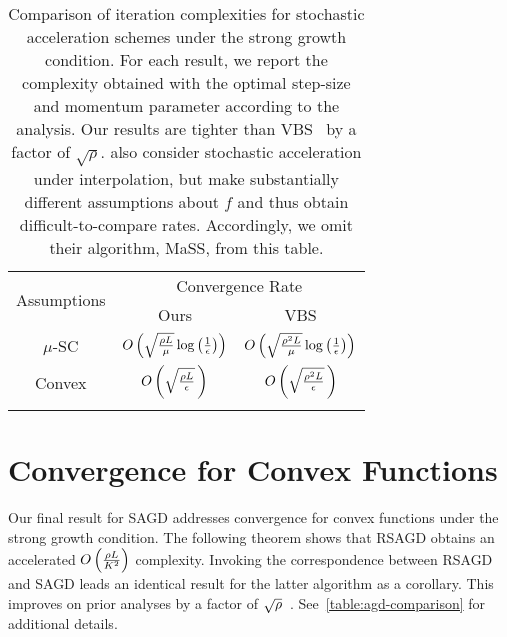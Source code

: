 \begin{table}[t]
    \centering
    \begin{tabular}{c c c  }\toprule
        \multirow{2}{*}{Assumptions} & \multicolumn{2}{c}{Convergence Rate}\\%
        \cmidrule(lr){2-3} 
                 & \multicolumn{1}{c}{Ours} & \multicolumn{1}{c}{VBS}\\ \midrule
        \( \mu \)-SC & \( O\left(\sqrt{\frac{\rho L}{\mu}} \log\left(\frac{1}{\epsilon}\right)\right) \)%
                     & \( O\left(\sqrt{\frac{\rho^2 L}{\mu}} \log\left(\frac{1}{\epsilon}\right)\right) \) \\ \addlinespace
        Convex       & \( O\left(\sqrt{\frac{\rho L}{\epsilon}}\,\right) \)%
                     & \( O\left(\sqrt{\frac{\rho^2 L}{\epsilon}}\,\right) \)\\ \addlinespace 
        \end{tabular}
        \caption[Comparison of iteration complexities for stochastic acceleration schemes under strong growth.]%
           {Comparison of iteration complexities for stochastic acceleration schemes under the strong growth condition.
            For each result, we report the complexity obtained with the optimal step-size and momentum parameter according to the analysis.
            Our results are tighter than VBS~\citep{vaswani2019fast} by a factor of \( \sqrt{\rho} \).
            \citet{liu2020accelerating} also consider stochastic acceleration under interpolation, but make substantially different assumptions about \( f \) and thus obtain difficult-to-compare rates.
            Accordingly, we omit their algorithm, MaSS, from this table. }%
    \label{table:agd-comparison}
\end{table}

\section{Convergence for Convex Functions}\label{sec:agd-convex}

Our final result for \ac{SAGD} addresses convergence for convex functions under the strong growth condition. 
The following theorem shows that \ac{RSAGD} obtains an accelerated \( O\left(\frac{\rho L}{K^2}\right) \) complexity.
Invoking the correspondence between \ac{RSAGD} and \ac{SAGD} leads an identical result for the latter algorithm as a corollary.
This improves on prior analyses by a factor of \( \sqrt{\rho} \)~\citep[Theorem 2]{vaswani2019fast}. 
See~\autoref{table:agd-comparison} for additional details.


